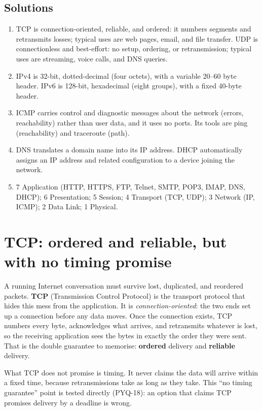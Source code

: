 \subsection*{Solutions}
\begingroup\small
\begin{enumerate}[label=\arabic*.]
  \item TCP is connection-oriented, reliable, and ordered: it numbers
    segments and retransmits losses; typical uses are web pages, email, and
    file transfer. UDP is connectionless and best-effort: no setup, ordering,
    or retransmission; typical uses are streaming, voice calls, and DNS
    queries.
  \item IPv4 is 32-bit, dotted-decimal (four octets), with a variable 20--60
    byte header. IPv6 is 128-bit, hexadecimal (eight groups), with a fixed
    40-byte header.
  \item ICMP carries control and diagnostic messages about the network
    (errors, reachability) rather than user data, and it uses no ports. Its
    tools are ping (reachability) and traceroute (path).
  \item DNS translates a domain name into its IP address. DHCP automatically
    assigns an IP address and related configuration to a device joining the
    network.
  \item 7 Application (HTTP, HTTPS, FTP, Telnet, SMTP, POP3, IMAP, DNS,
    DHCP); 6 Presentation; 5 Session; 4 Transport (TCP, UDP); 3 Network (IP,
    ICMP); 2 Data Link; 1 Physical.
\end{enumerate}
\endgroup

\section{TCP: ordered and reliable, but with no timing promise}
A running Internet conversation must survive lost, duplicated, and reordered
packets. \textbf{TCP} (Transmission Control Protocol) is the transport
protocol that hides this mess from the application. It is
\emph{connection-oriented}: the two ends set up a connection before any data
moves. Once the connection exists, TCP numbers every byte, acknowledges what
arrives, and retransmits whatever is lost, so the receiving application sees
the bytes in exactly the order they were sent. That is the double guarantee
to memorise: \textbf{ordered} delivery and \textbf{reliable} delivery.

What TCP does not promise is timing. It never claims the data will arrive
within a fixed time, because retransmissions take as long as they take. This
``no timing guarantee'' point is tested directly (PYQ-18): an option that
claims TCP promises delivery by a deadline is wrong.

